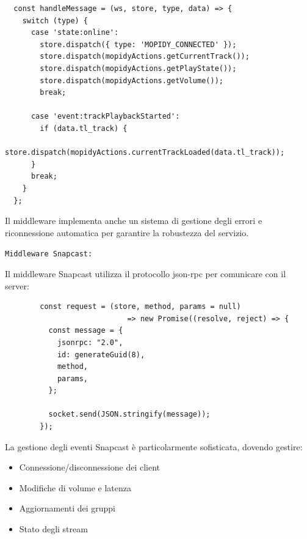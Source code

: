 \begin{table}[H]
  \begin{algorithm}[H]
    \caption{}
    \BlankLine
      \begin{verbatim}
  const handleMessage = (ws, store, type, data) => {
    switch (type) {
      case 'state:online':
        store.dispatch({ type: 'MOPIDY_CONNECTED' });
        store.dispatch(mopidyActions.getCurrentTrack());
        store.dispatch(mopidyActions.getPlayState());
        store.dispatch(mopidyActions.getVolume());
        break;
  
      case 'event:trackPlaybackStarted':
        if (data.tl_track) {
        store.dispatch(mopidyActions.currentTrackLoaded(data.tl_track));
      }
      break;
    }
  };
      \end{verbatim}
    \end{algorithm}
    \caption{}
    \label{tab:middleware_mopidy}
  \end{table}

Il middleware implementa anche un sistema di gestione degli errori e riconnessione automatica per garantire la robustezza del servizio.

\texttt{Middleware Snapcast:}

Il middleware Snapcast utilizza il protocollo \gls{json-rpc} per comunicare con il server:

\begin{table}[H]
  \begin{algorithm}[H]
    \caption{}
    \BlankLine
      \begin{verbatim}
        const request = (store, method, params = null) 
                            => new Promise((resolve, reject) => {
          const message = {
            jsonrpc: "2.0",
            id: generateGuid(8),
            method,
            params,
          };
  
          socket.send(JSON.stringify(message));
        });
      \end{verbatim}
    \end{algorithm}
    \caption{}
    \label{tab:request_function}
  \end{table}

La gestione degli eventi Snapcast è particolarmente sofisticata, dovendo gestire:

\begin{itemize}
    \item Connessione/disconnessione dei client
    \item Modifiche di volume e latenza
    \item Aggiornamenti dei gruppi
    \item Stato degli stream
\end{itemize}

